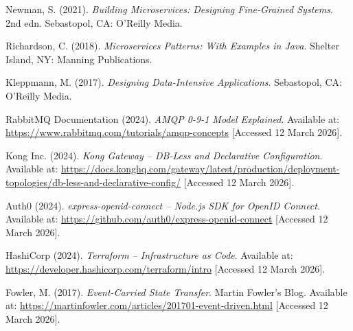 \documentclass[12pt,a4paper]{article}
\begin{document}
\begin{enumerate}[label={[\arabic*]}, leftmargin=*, itemsep=6pt]

  \item Newman, S. (2021). \textit{Building Microservices: Designing Fine-Grained Systems}. 2nd edn. Sebastopol, CA: O'Reilly Media.

  \item Richardson, C. (2018). \textit{Microservices Patterns: With Examples in Java}. Shelter Island, NY: Manning Publications.

  \item Kleppmann, M. (2017). \textit{Designing Data-Intensive Applications}. Sebastopol, CA: O'Reilly Media.

  \item RabbitMQ Documentation (2024). \textit{AMQP 0-9-1 Model Explained}. Available at: \url{https://www.rabbitmq.com/tutorials/amqp-concepts} [Accessed 12 March 2026].

  \item Kong Inc. (2024). \textit{Kong Gateway -- DB-Less and Declarative Configuration}. Available at: \url{https://docs.konghq.com/gateway/latest/production/deployment-topologies/db-less-and-declarative-config/} [Accessed 12 March 2026].

  \item Auth0 (2024). \textit{express-openid-connect -- Node.js SDK for OpenID Connect}. Available at: \url{https://github.com/auth0/express-openid-connect} [Accessed 12 March 2026].

  \item HashiCorp (2024). \textit{Terraform -- Infrastructure as Code}. Available at: \url{https://developer.hashicorp.com/terraform/intro} [Accessed 12 March 2026].

  \item Fowler, M. (2017). \textit{Event-Carried State Transfer}. Martin Fowler's Blog. Available at: \url{https://martinfowler.com/articles/201701-event-driven.html} [Accessed 12 March 2026].

\end{enumerate}
\end{document}
